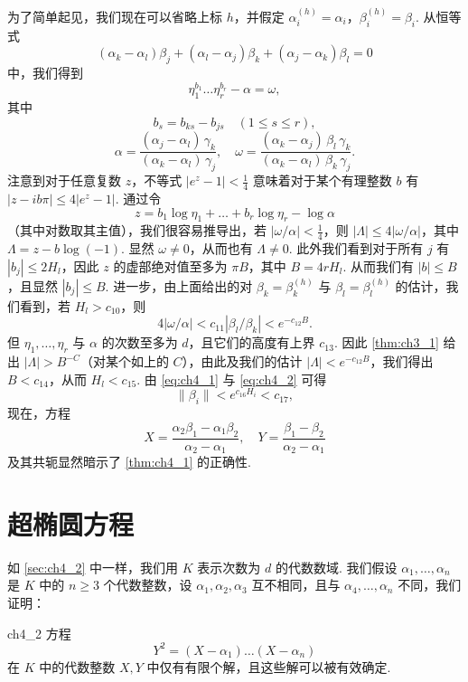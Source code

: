 为了简单起见，我们现在可以省略上标 $h$，并假定 $\alpha_i^{(h)} = \alpha_i$，$\beta_i^{(h)} = \beta_i$. 从恒等式
\[
(\alpha_k - \alpha_l) \beta_j + (\alpha_l - \alpha_j) \beta_k + (\alpha_j - \alpha_k) \beta_l = 0
\]
中，我们得到
\[
\eta_1^{b_1} \dots \eta_r^{b_r} - \alpha = \omega,
\]
其中
\[
b_s = b_{ks} - b_{js} \quad (1 \le s \le r),
\]
\[
\alpha = \frac{(\alpha_j - \alpha_l) \, \gamma_k}{(\alpha_k - \alpha_l) \, \gamma_j}, \quad \omega = \frac{(\alpha_k - \alpha_j) \, \beta_l \, \gamma_k}{(\alpha_k - \alpha_l) \, \beta_k \, \gamma_j}.
\]
注意到对于任意复数 $z$，不等式 $|e^z - 1| < \frac{1}{4}$ 意味着对于某个有理整数 $b$ 有 $|z - i b \pi| \le 4 |e^z - 1|$. 通过令
\[
z = b_1 \log \eta_1 + \dots + b_r \log \eta_r - \log \alpha
\]
（其中对数取其主值），我们很容易推导出，若 $|\omega/\alpha| < \frac{1}{4}$，则 $|\Lambda| \le 4 |\omega/\alpha|$，其中 $\Lambda = z - b \log (-1)$. 显然 $\omega \neq 0$，从而也有 $\Lambda \neq 0$. 此外我们看到对于所有 $j$ 有 $|b_j| \le 2H_l$，因此 $z$ 的虚部绝对值至多为 $\pi B$，其中 $B = 4rH_l$. 从而我们有 $|b| \le B$，且显然 $|b_j| \le B$. 进一步，由上面给出的对 $\beta_k = \beta_k^{(h)}$ 与 $\beta_l = \beta_l^{(h)}$ 的估计，我们看到，若 $H_l > c_{10}$，则
\[
4|\omega/\alpha| < c_{11}|\beta_l/\beta_k| < e^{-c_{12}B}.
\]
但 $\eta_1, \dots, \eta_r$ 与 $\alpha$ 的次数至多为 $d$，且它们的高度有上界 $c_{13}$. 因此 \autoref{thm:ch3_1} 给出 $|\Lambda| > B^{-C}$（对某个如上的 $C$），由此及我们的估计 $|\Lambda| < e^{-c_{12}B}$，我们得出 $B < c_{14}$，从而 $H_l < c_{15}$. 由 \eqref{eq:ch4_1} 与 \eqref{eq:ch4_2} 可得
\[
\|\beta_i\| < e^{c_{16}H_i} < c_{17},
\]
现在，方程
\[
X = \frac{\alpha_2 \beta_1 - \alpha_1 \beta_2}{\alpha_2 - \alpha_1}, \quad Y = \frac{\beta_1 - \beta_2}{\alpha_2 - \alpha_1}
\]
及其共轭显然暗示了 \autoref{thm:ch4_1} 的正确性.

\section{超椭圆方程}\label{sec:ch4_3}

如 \autoref{sec:ch4_2} 中一样，我们用 $K$ 表示次数为 $d$ 的代数数域. 我们假设 $\alpha_1, \dots, \alpha_n$ 是 $K$ 中的 $n \ge 3$ 个代数整数，设 $\alpha_1, \alpha_2, \alpha_3$ 互不相同，且与 $\alpha_4, \dots, \alpha_n$ 不同，我们证明：

\begin{mythm}{}{ch4_2}
方程
\begin{equation} \label{eq:ch4_3}\tag{3}
Y^2 = (X - \alpha_1) \dots (X - \alpha_n)
\end{equation}
在 $K$ 中的代数整数 $X, Y$ 中仅有有限个解，且这些解可以被有效确定.
\end{mythm}

